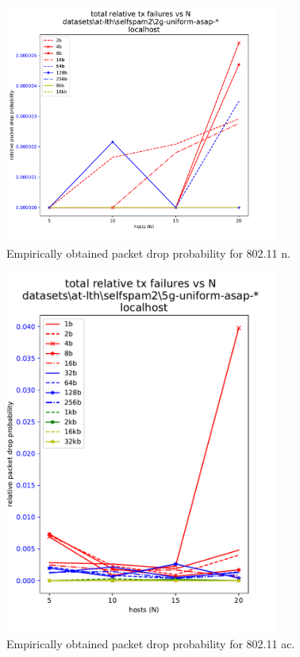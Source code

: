 \begin{figure}[tbp]
  \centering
  \includegraphics[width=0.8\textwidth]{images/relative_tx_fail_2g.pdf}
  \caption{Empirically obtained packet drop probability for 802.11 n.}
  \label{fig:relative_txfail_2g}
\end{figure}

\begin{figure}[tbp]
  \centering
  \includegraphics[width=0.8\textwidth]{images/relative_tx_fail_5g.pdf}
  \caption{Empirically obtained packet drop probability for 802.11 ac.}
  \label{fig:relative_txfail_5g}
\end{figure}


